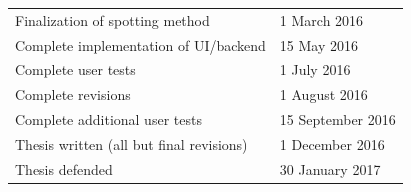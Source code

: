 \documentclass[ms]{byuprop}
\begin{document}
\begin{table}[H]
\centering
\begin{tabular}{ll}
Finalization of spotting method          & 1 March 2016 \\
Complete implementation of UI/backend    & 15 May 2016    \\
Complete user tests                      & 1 July 2016   \\
Complete revisions                       & 1 August 2016      \\
Complete additional user tests           & 15 September 2016     \\
Thesis written (all but final revisions) & 1 December 2016     \\
Thesis defended                          & 30 January 2017    
\end{tabular}
\end{table}





\end{document}
